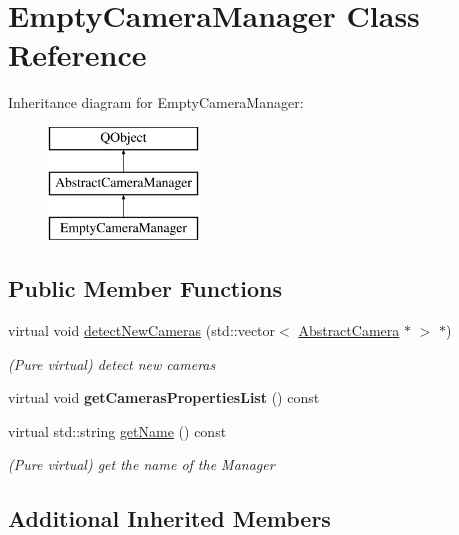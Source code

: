 \hypertarget{class_empty_camera_manager}{\section{Empty\-Camera\-Manager Class Reference}
\label{class_empty_camera_manager}
}
Inheritance diagram for Empty\-Camera\-Manager\-:\begin{figure}[H]
\begin{center}
\leavevmode
\includegraphics[height=3.000000cm]{class_empty_camera_manager}
\end{center}
\end{figure}
\subsection*{Public Member Functions}
\begin{DoxyCompactItemize}
\item 
virtual void \hyperlink{class_empty_camera_manager_ae32a44d1576763cf49d46dba3aef0007}{detect\-New\-Cameras} (std\-::vector$<$ \hyperlink{class_abstract_camera}{Abstract\-Camera} $\ast$ $>$ $\ast$)
\begin{DoxyCompactList}\small\item\em (Pure virtual) detect new cameras \end{DoxyCompactList}\item 
\hypertarget{class_empty_camera_manager_a321c93993d5bdd065f9ea875ee7b7961}{virtual void {\bfseries get\-Cameras\-Properties\-List} () const }\label{class_empty_camera_manager_a321c93993d5bdd065f9ea875ee7b7961}

\item 
virtual std\-::string \hyperlink{class_empty_camera_manager_acd29e9bb06b9839e5c94b6ffe5ee86a9}{get\-Name} () const 
\begin{DoxyCompactList}\small\item\em (Pure virtual) get the name of the Manager \end{DoxyCompactList}\end{DoxyCompactItemize}
\subsection*{Additional Inherited Members}


